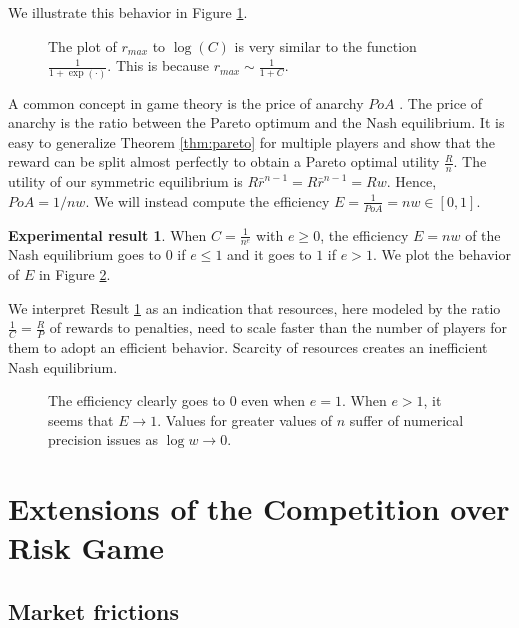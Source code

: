 \documentclass[preprint,12pt,authoryear,doubleblind]{elsarticle}
\theoremstyle{definition}
\newtheorem{result}[theorem]{Experimental result}
\begin{document}
We illustrate this behavior in Figure \ref{fig:cutoff-asymptotic}.

\begin{figure}[htbp]
    \centering
    
    \caption{The plot of $r_{max}$ to $\log(C)$ is very similar to the function $\frac{1}{1 + \exp(\cdot)}$. This is because $r_{max} \sim \frac{1}{1+C}$.}
    \label{fig:cutoff-asymptotic}
\end{figure}



A common concept in game theory is the price of anarchy $PoA$ \citep{koutsoupias1999worst}. The price of anarchy is the ratio between the Pareto optimum and the Nash equilibrium. It is easy to generalize Theorem \ref{thm:pareto} for multiple players and show that the reward can be split almost perfectly to obtain a Pareto optimal utility $\frac{R}{n}$. The utility of our symmetric equilibrium is $R \bar r ^ {n-1} = R \bar r ^ {n-1} = R w$. Hence, $PoA = 1 / n w$. We will instead compute the efficiency $E = \frac{1}{PoA} = n w \in [0,1]$.


\begin{result}
\label{res:scaling}
    When $C = \frac{1}{n^e}$ with $e \ge 0$, the efficiency $E = n w$ of the Nash equilibrium goes to $0$ if $e \le 1$ and it goes to $1$ if $e > 1$. We plot the behavior of $E$ in Figure \ref{fig:efficiency}.
\end{result}

We interpret Result \ref{res:scaling} as an indication that resources, here modeled by the ratio $\frac{1}{C} = \frac{R}{P}$ of rewards to penalties, need to scale faster than the number of players for them to adopt an efficient behavior. Scarcity of resources creates an inefficient Nash equilibrium.

\begin{figure}[htbp]
    \centering
    
    \caption{The efficiency clearly goes to $0$ even when $e = 1$. When $e>1$, it seems that $E \rightarrow 1$. Values for greater values of $n$ suffer of numerical precision issues as $\log w \rightarrow 0$.}
    \label{fig:efficiency}
\end{figure}

\section{Extensions of the Competition over Risk Game}


\subsection{Market frictions}
\end{document}
